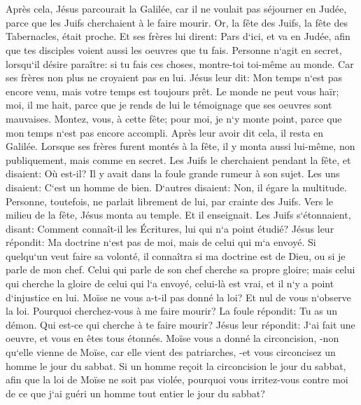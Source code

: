 \chapter{}

\verse Après cela, Jésus parcourait la Galilée, car il ne voulait pas séjourner en Judée, parce que les Juifs cherchaient à le faire mourir. 
\verse Or, la fête des Juifs, la fête des Tabernacles, était proche. 
\verse Et ses frères lui dirent: Pars d`ici, et va en Judée, afin que tes disciples voient aussi les oeuvres que tu fais. 
\verse Personne n`agit en secret, lorsqu`il désire paraître: si tu fais ces choses, montre-toi toi-même au monde. 
\verse Car ses frères non plus ne croyaient pas en lui. 
\verse Jésus leur dit: Mon temps n`est pas encore venu, mais votre temps est toujours prêt. 
\verse Le monde ne peut vous haïr; moi, il me hait, parce que je rends de lui le témoignage que ses oeuvres sont mauvaises. 
\verse Montez, vous, à cette fête; pour moi, je n`y monte point, parce que mon temps n`est pas encore accompli. 
\verse Après leur avoir dit cela, il resta en Galilée. 
\verse Lorsque ses frères furent montés à la fête, il y monta aussi lui-même, non publiquement, mais comme en secret. 
\verse Les Juifs le cherchaient pendant la fête, et disaient: Où est-il? 
\verse Il y avait dans la foule grande rumeur à son sujet. Les uns disaient: C`est un homme de bien. D`autres disaient: Non, il égare la multitude. 
\verse Personne, toutefois, ne parlait librement de lui, par crainte des Juifs. 
\verse Vers le milieu de la fête, Jésus monta au temple. Et il enseignait. 
\verse Les Juifs s`étonnaient, disant: Comment connaît-il les Écritures, lui qui n`a point étudié? 
\verse Jésus leur répondit: Ma doctrine n`est pas de moi, mais de celui qui m`a envoyé. 
\verse Si quelqu`un veut faire sa volonté, il connaîtra si ma doctrine est de Dieu, ou si je parle de mon chef. 
\verse Celui qui parle de son chef cherche sa propre gloire; mais celui qui cherche la gloire de celui qui l`a envoyé, celui-là est vrai, et il n`y a point d`injustice en lui. 
\verse Moïse ne vous a-t-il pas donné la loi? Et nul de vous n`observe la loi. Pourquoi cherchez-vous à me faire mourir? 
\verse La foule répondit: Tu as un démon. Qui est-ce qui cherche à te faire mourir? 
\verse Jésus leur répondit: J`ai fait une oeuvre, et vous en êtes tous étonnés. 
\verse Moïse vous a donné la circoncision, -non qu`elle vienne de Moïse, car elle vient des patriarches, -et vous circoncisez un homme le jour du sabbat. 
\verse Si un homme reçoit la circoncision le jour du sabbat, afin que la loi de Moïse ne soit pas violée, pourquoi vous irritez-vous contre moi de ce que j`ai guéri un homme tout entier le jour du sabbat? 
